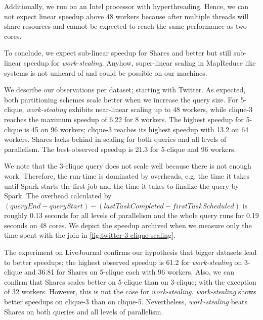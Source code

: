 Additionally, we run on an Intel processor with hyperthreading.
Hence, we can not expect linear speedup above 48 workers because after multiple threads will share resources and cannot be
expected to reach the same performance as two cores.

To conclude, we expect sub-linear speedup for Shares and better but still sub-linear speedup for \textit{work-stealing}.
Anyhow, super-linear scaling in MapReduce like systems is not unheard of and could be possible on our machines.

We describe our observations per dataset;
starting with Twitter.
As expected, both partitioning schemes scale better when we increase the query size.
For 5-clique, \textit{work-stealing} exhibits near-linear scaling up to 48 workers, while
clique-3 reaches the maximum speedup of 6.22 for 8 workers.
The highest speedup for 5-clique is 45 on 96 workers; clique-3 reaches its highest speedup
with 13.2 on 64 workers.
Shares lacks behind in scaling for both queries and all levels of parallelism.
The best-observed speedup is 21.3 for 5-clique and 96 workers.

We note that the 3-clique query does not scale well because there is not enough work.
Therefore, the run-time is dominated by overheads, e.g. the time it takes until Spark starts
the first job and the time it takes to finalize the query by Spark.
The overhead calculated by $(queryEnd - queryStart) - (lastTaskCompleted - firstTaskScheduled)$ is
roughly 0.13 seconds for all levels of parallelism and the whole query runs for 0.19 seconds on
48 cores.
We depict the speedup archived when we measure only the time spent with the join in \cref{fig:twitter-3-clique-scaling}.


The experiment on LiveJournal confirms our hypothesis that bigger datasets lead to better
speedups;
the highest observed speedup is 61.2 for \textit{work-stealing} on 3-clique and
36.81 for Shares on 5-clique each with 96 workers.
Also, we can confirm that Shares scales better on 5-clique than on 3-clique; with the exception of 32 workers.
However, this is not the case for \textit{work-stealing}.
\textit{work-stealing} shows better speedups on clique-3 than on clique-5.
Nevertheless, \textit{work-stealing} beats Shares on both queries and all levels of parallelism.

